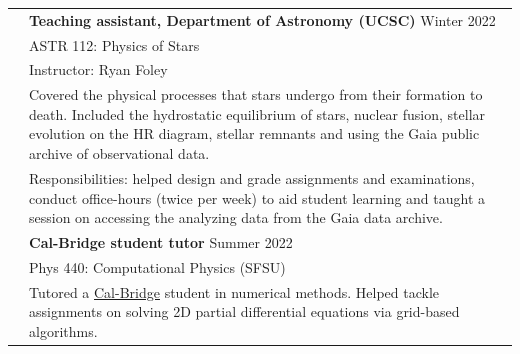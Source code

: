 \documentclass[letterpaper, 11pt]{article}
\begin{document}
\begin{longtable}{p{1.3in}p{4.8in}}
& \textbf{Teaching assistant, Department of Astronomy (UCSC)} \hfill Winter 2022 \\
& ASTR 112: Physics of Stars\\
& Instructor: Ryan Foley\\
& Covered the physical processes that stars undergo from their formation to death. Included the hydrostatic equilibrium of stars, nuclear fusion, stellar evolution on the HR diagram, stellar remnants and using the Gaia public archive of observational data.\\
& Responsibilities: helped design and grade assignments and examinations, conduct office-hours (twice per week) to aid student learning and taught a session on accessing the analyzing data from the Gaia data archive.\\
& \textbf{Cal-Bridge student tutor} \hfill Summer 2022\\
& Phys 440: Computational Physics (SFSU)\\
& Tutored a \href{https://calbridge.smapply.org/}{Cal-Bridge} student in numerical methods. Helped tackle assignments on solving 2D partial differential equations via grid-based algorithms.\\


\end{longtable}
\end{document}
